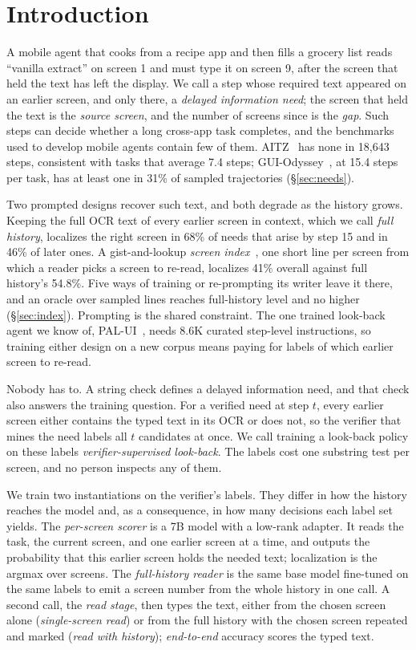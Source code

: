 \section{Introduction}
A mobile agent that cooks from a recipe app and then fills a grocery list reads ``vanilla extract'' on screen 1 and must type it on screen 9, after the screen that held the text has left the display. We call a step whose required text appeared on an earlier screen, and only there, a \emph{delayed information need}; the screen that held the text is the \emph{source screen}, and the number of screens since is the \emph{gap}. Such steps can decide whether a long cross-app task completes, and the benchmarks used to develop mobile agents contain few of them. AITZ~\citep{aitz} has none in 18,643 steps, consistent with tasks that average 7.4 steps; GUI-Odyssey~\citep{guiodyssey}, at 15.4 steps per task, has at least one in 31\% of sampled trajectories (\S\ref{sec:needs}).

Two prompted designs recover such text, and both degrade as the history grows. Keeping the full OCR text of every earlier screen in context, which we call \emph{full history}, localizes the right screen in 68\% of needs that arise by step 15 and in 46\% of later ones. A gist-and-lookup \emph{screen index}~\citep{readagent}, one short line per screen from which a reader picks a screen to re-read, localizes 41\% overall against full history's 54.8\%. Five ways of training or re-prompting its writer leave it there, and an oracle over sampled lines reaches full-history level and no higher (\S\ref{sec:index}). Prompting is the shared constraint. The one trained look-back agent we know of, PAL-UI~\citep{palui}, needs 8.6K curated step-level instructions, so training either design on a new corpus means paying for labels of which earlier screen to re-read.

Nobody has to. A string check defines a delayed information need, and that check also answers the training question. For a verified need at step $t$, every earlier screen either contains the typed text in its OCR or does not, so the verifier that mines the need labels all $t$ candidates at once. We call training a look-back policy on these labels \emph{verifier-supervised look-back}. The labels cost one substring test per screen, and no person inspects any of them.

We train two instantiations on the verifier's labels. They differ in how the history reaches the model and, as a consequence, in how many decisions each label set yields. The \emph{per-screen scorer} is a 7B model with a low-rank adapter. It reads the task, the current screen, and one earlier screen at a time, and outputs the probability that this earlier screen holds the needed text; localization is the argmax over screens. The \emph{full-history reader} is the same base model fine-tuned on the same labels to emit a screen number from the whole history in one call. A second call, the \emph{read stage}, then types the text, either from the chosen screen alone (\emph{single-screen read}) or from the full history with the chosen screen repeated and marked (\emph{read with history}); \emph{end-to-end} accuracy scores the typed text.

